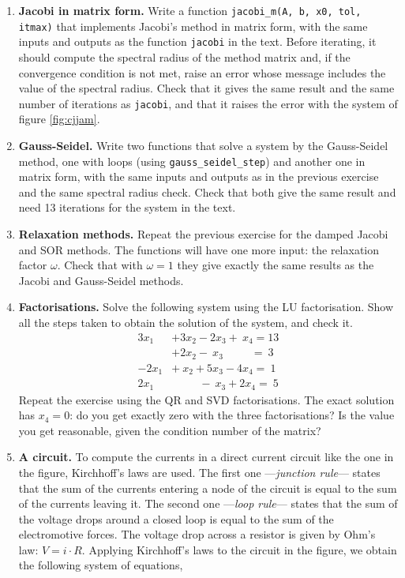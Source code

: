 \begin{enumerate}
\item \label{ej:jacobi-en} \textbf{Jacobi in matrix form.} Write a function \texttt{jacobi\_m(A, b, x0, tol, itmax)} that implements Jacobi's method in matrix form, with the same inputs and outputs as the function \texttt{jacobi} in the text. Before iterating, it should compute the spectral radius of the method matrix and, if the convergence condition is not met, raise an error whose message includes the value of the spectral radius. Check that it gives the same result and the same number of iterations as \texttt{jacobi}, and that it raises the error with the system of figure \ref{fig:cjjam}.

\item \label{ej:gs-en} \textbf{Gauss-Seidel.} Write two functions that solve a system by the Gauss-Seidel method, one with loops (using \texttt{gauss\_seidel\_step}) and another one in matrix form, with the same inputs and outputs as in the previous exercise and the same spectral radius check. Check that both give the same result and need 13 iterations for the system in the text.

\item \label{ej:amortiguados-en} \textbf{Relaxation methods.} Repeat the previous exercise for the damped Jacobi and SOR methods. The functions will have one more input: the relaxation factor $\omega$. Check that with $\omega=1$ they give exactly the same results as the Jacobi and Gauss-Seidel methods.

\item \textbf{Factorisations.} Solve the following system using the LU factorisation. Show all the steps taken to obtain the solution of the system, and check it.
\begin{align*}
3x_1&+3x_2-2x_3 +\ x_4= 13\\
 &+2x_2-\ x_3  \hspace{30pt} =\ 3\\
-2x_1&+\ x_2 + 5x_3 -4x_4=\ 1\\
2x_1& \hspace{30pt} -\ x_3 +2x_4 =\ 5
\end{align*}
Repeat the exercise using the QR and SVD factorisations. The exact solution has $x_4=0$: do you get exactly zero with the three factorisations? Is the value you get reasonable, given the condition number of the matrix?

\item \label{ej:circuito-en} \textbf{A circuit.} To compute the currents in a direct current circuit like the one in the figure, Kirchhoff's laws are used. The first one ---\emph{junction rule}--- states that the sum of the currents entering a node of the circuit is equal to the sum of the currents leaving it. The second one ---\emph{loop rule}--- states that the sum of the voltage drops around a closed loop is equal to the sum of the electromotive forces. The voltage drop across a resistor is given by Ohm's law: $V = i\cdot R$.
Applying Kirchhoff's laws to the circuit in the figure, we obtain the following system of equations,


\end{enumerate}
